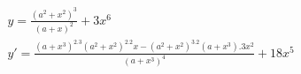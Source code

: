 \begin{ex}
\begin{align}
&y=\frac{(a^2+x^2)^3}{(a+x)^2}+3x^6\nonumber\\
&y'=\frac{(a+x^3)^2.3(a^2+x^2)^2.2x-(a^2+x^2)^3.2(a+x^3).3x^2}{(a+x^3)^4}+18x^5\nonumber
\end{align}
\end{ex}